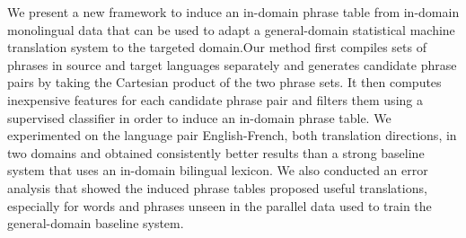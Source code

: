 We present a new framework to induce an in-domain phrase table from in-domain monolingual data that can be used to adapt a general-domain statistical machine translation system to the targeted domain.Our method first compiles sets of phrases in source and target languages separately and generates candidate phrase pairs by taking the Cartesian product of the two phrase sets.  It then computes inexpensive features for each candidate phrase pair and filters them using a supervised classifier in order to induce an in-domain phrase table. We experimented on the language pair English-French, both translation directions, in two domains and obtained consistently better results than a strong baseline system that uses an in-domain bilingual lexicon. We also conducted an error analysis that showed the induced phrase tables proposed useful translations, especially for words and phrases unseen in the parallel data used to train the general-domain baseline system.